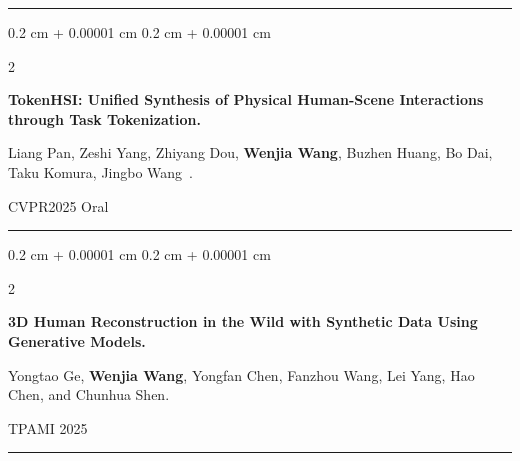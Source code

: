 \documentclass[10pt, letterpaper]{article}
\newenvironment{onecolentry}{
    \begin{adjustwidth}{
        0.2 cm + 0.00001 cm
    }{
        0.2 cm + 0.00001 cm
    }
}{
    \end{adjustwidth}
} %
\newenvironment{twocolentry}[2][]{
    \onecolentry
    \def\secondColumn{#2}
    \setcolumnwidth{\fill, 4.5 cm}
    \begin{paracol}{2}
}{
    \switchcolumn \raggedleft \secondColumn
    \end{paracol}
    \endonecolentry
} %
\let\hrefWithoutArrow\href
\renewcommand{\href}[2]{\hrefWithoutArrow{#1}{\ifthenelse{\equal{#2}{}}{ }{#2 }\raisebox{.15ex}{\footnotesize \faExternalLink*}}}
\begin{document}
{\color{gray!40}\noindent\rule{0.98\textwidth}{0.3pt}}

        \begin{samepage}
            \begin{twocolentry}{
                CVPR2025 Oral
            }
                \textbf{TokenHSI: Unified Synthesis of Physical Human-Scene Interactions through Task Tokenization. }

                \vspace{0.10 cm}
                \small Liang Pan, Zeshi Yang, Zhiyang Dou, \textbf{Wenjia Wang}, Buzhen Huang, Bo Dai, Taku Komura, Jingbo Wang~\Letter.
            \end{twocolentry}
             \vspace{-0.15 cm}
        \end{samepage}

{\color{gray!40}\noindent\rule{0.98\textwidth}{0.3pt}}

        
        \begin{samepage}
            \begin{twocolentry}{
                TPAMI 2025
            }
                \textbf{3D Human Reconstruction in the Wild with Synthetic Data Using Generative Models.}

                \vspace{0.10 cm}
                \small Yongtao Ge, \textbf{Wenjia Wang}, Yongfan Chen, Fanzhou Wang, Lei Yang, Hao Chen, and Chunhua Shen.
            \end{twocolentry}


             \vspace{-0.15 cm}

        \end{samepage}

{\color{gray!40}\noindent\rule{0.98\textwidth}{0.3pt}}
\end{document}
